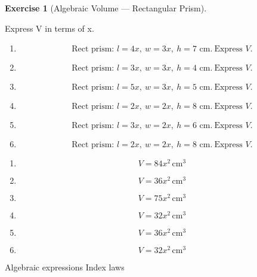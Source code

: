 \documentclass[
  letterpaper,
  DIV=11,
  numbers=noendperiod]{scrreprt}
\theoremstyle{definition}
\newtheorem{exercise}{Exercise}[chapter]
\theoremstyle{remark}
\begin{document}
\begin{exercise}[Algebraic Volume --- Rectangular
Prism]\protect\hypertarget{exr-alg-1}{}\label{exr-alg-1}

Express V in terms of x.

\begin{enumerate}
\def\labelenumi{\alph{enumi})}
\item
  \[\text{Rect prism: }l=4x,\ w=3x,\ h=7\text{ cm.}\ \text{Express }V.\]
\item
  \[\text{Rect prism: }l=3x,\ w=3x,\ h=4\text{ cm.}\ \text{Express }V.\]
\item
  \[\text{Rect prism: }l=5x,\ w=3x,\ h=5\text{ cm.}\ \text{Express }V.\]
\item
  \[\text{Rect prism: }l=2x,\ w=2x,\ h=8\text{ cm.}\ \text{Express }V.\]
\item
  \[\text{Rect prism: }l=3x,\ w=2x,\ h=6\text{ cm.}\ \text{Express }V.\]
\item
  \[\text{Rect prism: }l=2x,\ w=2x,\ h=8\text{ cm.}\ \text{Express }V.\]
\end{enumerate}

\begin{tcolorbox}[enhanced jigsaw, opacitybacktitle=0.6, coltitle=black, arc=.35mm, colframe=quarto-callout-tip-color-frame, colback=white, bottomrule=.15mm, left=2mm, colbacktitle=quarto-callout-tip-color!10!white, titlerule=0mm, opacityback=0, title=\textcolor{quarto-callout-tip-color}{\faLightbulb}\hspace{0.5em}{🔍 View Solution}, leftrule=.75mm, breakable, rightrule=.15mm, bottomtitle=1mm, toptitle=1mm, toprule=.15mm]

\begin{enumerate}
\def\labelenumi{\alph{enumi})}
\item
  \[V=84x^2\,\text{cm}^{3}\]
\item
  \[V=36x^2\,\text{cm}^{3}\]
\item
  \[V=75x^2\,\text{cm}^{3}\]
\item
  \[V=32x^2\,\text{cm}^{3}\]
\item
  \[V=36x^2\,\text{cm}^{3}\]
\item
  \[V=32x^2\,\text{cm}^{3}\]
\end{enumerate}

\end{tcolorbox}

{Algebraic expressions} {Index laws}

\end{exercise}
\end{document}
